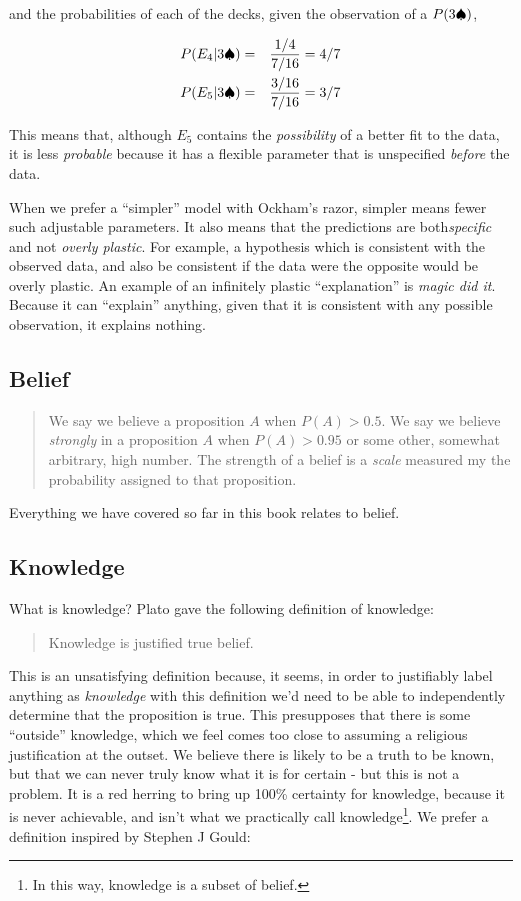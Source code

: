 \documentclass{tufte-book}
\begin{document}
and the probabilities of each of the decks, given the observation of a
\(P(3\spadesuit)\),

\begin{eqnarray*}
P(E_4|3\spadesuit)&=&\frac{1/4}{7/16} = 4/7\\
P(E_5|3\spadesuit)&=&\frac{3/16}{7/16} = 3/7
\end{eqnarray*}

This means that, although \(E_5\) contains the \emph{possibility} of a
better fit to the data, it is less \emph{probable} because it has a
flexible parameter that is unspecified \emph{before} the data.

When we prefer a ``simpler'' model with Ockham's razor, simpler means
fewer such adjustable parameters. It also means that the predictions are
both\emph{specific} and not \emph{overly plastic}. For example, a
hypothesis which is consistent with the observed data, and also be
consistent if the data were the opposite would be overly plastic. An
example of an infinitely plastic ``explanation'' is \emph{magic did it}.
Because it can ``explain'' anything, given that it is consistent with
any possible observation, it explains nothing.

\subsection{Belief}\label{belief}

\begin{quote}
We say we believe a proposition \(A\) when \(P(A)>0.5\). We say we
believe \emph{strongly} in a proposition \(A\) when \(P(A)>0.95\) or
some other, somewhat arbitrary, high number. The strength of a belief is
a \emph{scale} measured my the probability assigned to that proposition.
\end{quote}

Everything we have covered so far in this book relates to belief.

\subsection{Knowledge}\label{knowledge}

What is knowledge? Plato gave the following definition of knowledge:

\begin{quote}
Knowledge is justified true belief.\citep{fine2003plato}
\end{quote}

This is an unsatisfying definition because, it seems, in order to
justifiably label anything as \emph{knowledge} with this definition we'd
need to be able to independently determine that the proposition is true.
This presupposes that there is some ``outside'' knowledge, which we feel
comes too close to assuming a religious justification at the outset. We
believe there is likely to be a truth to be known, but that we can never
truly know what it is for certain - but this is not a problem. It is a
red herring to bring up 100\% certainty for knowledge, because it is
never achievable, and isn't what we practically call knowledge\footnote{In
  this way, knowledge is a subset of belief.}. We prefer a definition
inspired by Stephen J Gould:
\end{document}
